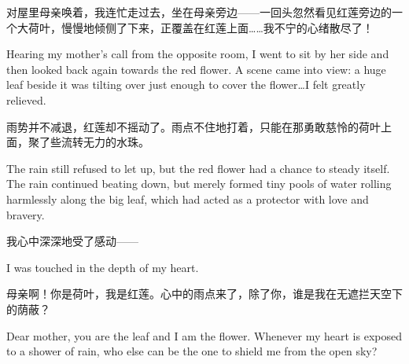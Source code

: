 { 对屋里母亲唤着，我连忙走过去，坐在母亲旁边——一回头忽然看见红莲旁边的一个大荷叶，慢慢地倾侧了下来，正覆盖在红莲上面……我不宁的心绪散尽了！
 
 Hearing my mother’s call from the opposite room, I went to sit by her side and then looked back again towards the red flower. A scene came into view: a huge leaf beside it was tilting over just enough to cover the flower…I felt greatly relieved.
 
 雨势并不减退，红莲却不摇动了。雨点不住地打着，只能在那勇敢慈怜的荷叶上面，聚了些流转无力的水珠。
 
 The rain still refused to let up, but the red flower had a chance to steady itself. The rain continued beating down, but merely formed tiny pools of water rolling harmlessly along the big leaf, which had acted as a protector with love and bravery.
 
 我心中深深地受了感动——
 
 I was touched in the depth of my heart.
 
 母亲啊！你是荷叶，我是红莲。心中的雨点来了，除了你，谁是我在无遮拦天空下的荫蔽？
 
 Dear mother, you are the leaf and I am the flower. Whenever my heart is exposed to a shower of rain, who else can be the one to shield me from the open sky?

}



